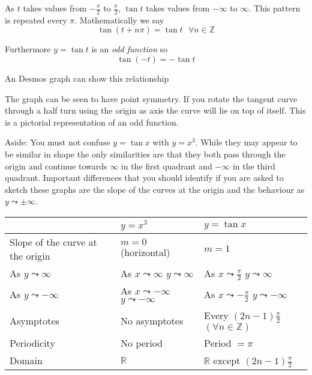 As $t$ takes values from $ -\frac{\pi }{2}$ to $\frac{\pi }{2}$, $\tan  t$ takes values from $ -\infty $ to $\infty $. This pattern is repeated every $\pi $. Mathematically we say
\begin{equation*}\tan  \left (t +n \pi \right ) =\tan  t\text{\  } \forall n \in \mathbb{Z}
\end{equation*}

Furthermore $y =\tan  t$ is an \emph{odd function} so
\begin{equation*}\tan  \left ( -t\right ) = -\tan  t
\end{equation*}

An Desmos graph can show this relationship 


\setlength\fboxrule{0.01in}\setlength\fboxsep{0.2in}


The graph can be seen to have point symmetry. If you rotate the tangent curve through
a half turn using the origin as axis the curve will lie on top of itself. This is a pictorial representation
of an odd function.

Aside: You must not confuse $y =\tan  x$ with $y =x^{3}$. While they may appear to be similar in shape the only similarities are that they both
pass through the origin and continue towards $\infty $ in the first quadrant and $ -\infty $ in the third quadrant. Important differences that you should identify if you
are asked to sketch these graphs are the slope of the curves at the origin and the behaviour as $y \leadsto  \pm \infty $. 


\begin{tabular}[c]{l|l|l|}  & $y =x^{3}$  & $y =\tan  x$  \\
	\hline
	Slope of the curve at the origin  & $m =0$ {\scriptsize (horizontal)}  & $m =1$  \\
	\hline
	As $y \leadsto \infty $  & As $x \leadsto \infty $ $y \leadsto \infty $  & As $x \leadsto \frac{\pi }{2}$ $y \leadsto \infty $  \\
	\hline
	As $y \leadsto  -\infty $  & As $x \leadsto  -\infty $ $y \leadsto  -\infty $  & As $x \leadsto  -\frac{\pi }{2}$ $y \leadsto  -\infty $  \\
	\hline
	Asymptotes  & No
	asymptotes  & Every $\left (2 n -1\right ) \frac{\pi }{2}$ $\left ( \forall n \in \mathbb{Z}\right )$  \\
	\hline
	Periodicity
	& No period  & Period $ =\pi $  \\
	\hline
	Domain  & $\mathbb{R}$  & $\mathbb{R}$ except $\left (2 n -1\right ) \frac{\pi }{2}$  \\
	\hline
\end{tabular}

